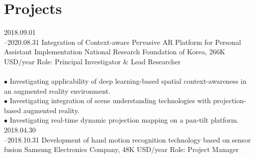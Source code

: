 \documentclass[]{friggeri-cv}
\begin{document}
\section{Projects}

\begin{entrylist}
  \entry
    {2018.09.01\\--2020.08.31} %
    {Integration of Context-aware Pervasive AR Platform for Personal Assistant Implementation}
    {National Research Foundation of Korea, 266K USD/year}
    {Role: Principal Investigator \& Lead Researcher\\
    \\
    $\bullet$ Investigating applicability of deep learning-based spatial context-awareness in an augmented reality environment.\\
    $\bullet$ Investigating integration of  scene understanding technologies with projection-based augmented reality.\\
    $\bullet$ Investigating real-time dynamic projection mapping on a pan-tilt platform.
    }
  \entry
    {2018.04.30\\--2018.10.31}
    {Development of hand motion recognition technology based on sensor fusion}
    {Samsung Electronics Company, 48K USD/year}
    {Role: Project Manager\\
    
}
\end{entrylist}
\end{document}
